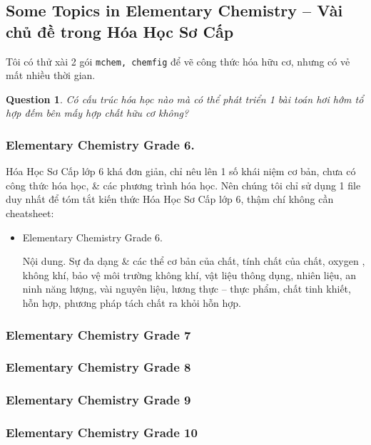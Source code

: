 \documentclass[12pt,twoside]{book}
\newtheorem{question}{Question}
\begin{document}

\subsection{Some Topics in Elementary Chemistry -- Vài chủ đề trong Hóa Học Sơ Cấp}
Tôi có thử xài 2 gói {\tt mchem, chemfig} để vẽ công thức hóa hữu cơ, nhưng có vẻ mất nhiều thời gian.

\begin{question}
	Có cấu trúc hóa học nào mà có thể phát triển 1 bài toán hơi hớm tổ hợp đếm bên mấy hợp chất hữu cơ không?
\end{question}

\subsubsection{Elementary Chemistry Grade 6.} Hóa Học Sơ Cấp lớp 6 khá đơn giản, chỉ nêu lên 1 số khái niệm cơ bản, chưa có công thức hóa học, \& các phương trình hóa học. Nên chúng tôi chỉ sử dụng 1 file duy nhất để tóm tắt kiến thức Hóa Học Sơ Cấp lớp 6, thậm chí không cần cheatsheet:
\begin{itemize}
	\item Elementary Chemistry Grade 6.
	
	{\sf Nội dung.} Sự đa dạng \& các thể cơ bản của chất, tính chất của chất, oxygen , không khí, bảo vệ môi trường không khí, vật liệu thông dụng, nhiên liệu, an ninh năng lượng, vài nguyên liệu, lương thực -- thực phẩm, chất tinh khiết, hỗn hợp, phương pháp tách chất ra khỏi hỗn hợp.
\end{itemize}

\subsubsection{Elementary Chemistry Grade 7}

\subsubsection{Elementary Chemistry Grade 8}

\subsubsection{Elementary Chemistry Grade 9}

\subsubsection{Elementary Chemistry Grade 10}
\end{document}
